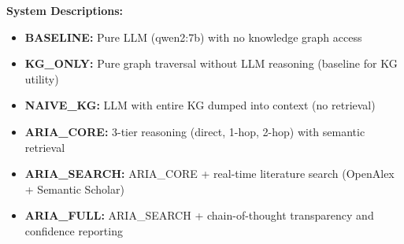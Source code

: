 \begin{table}[ht!]
\noindent\textbf{System Descriptions:}
\begin{itemize}[leftmargin=*,noitemsep]
    \item \textbf{BASELINE:} Pure LLM (qwen2:7b) with no knowledge graph access
    \item \textbf{KG\_ONLY:} Pure graph traversal without LLM reasoning (baseline for KG utility)
    \item \textbf{NAIVE\_KG:} LLM with entire KG dumped into context (no retrieval)
    \item \textbf{ARIA\_CORE:} 3-tier reasoning (direct, 1-hop, 2-hop) with semantic retrieval
    \item \textbf{ARIA\_SEARCH:} ARIA\_CORE + real-time literature search (OpenAlex + Semantic Scholar)
    \item \textbf{ARIA\_FULL:} ARIA\_SEARCH + chain-of-thought transparency and confidence reporting
\end{itemize}

\end{table}
